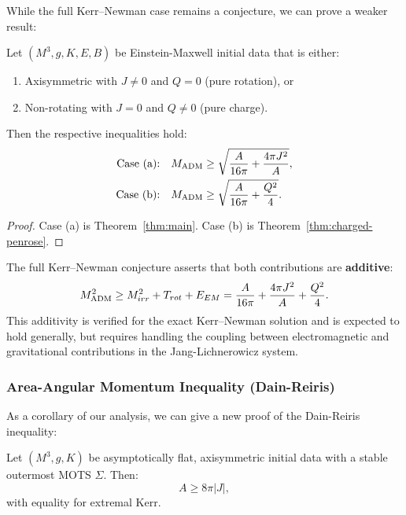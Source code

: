 While the full Kerr--Newman case remains a conjecture, we can prove a weaker result:

\begin{theorem}\label{thm:partial-KN}
Let $(M^3, g, K, E, B)$ be Einstein-Maxwell initial data that is either:
\begin{enumerate}[label=(\alph*)]
    \item Axisymmetric with $J \neq 0$ and $Q = 0$ (pure rotation), or
    \item Non-rotating with $J = 0$ and $Q \neq 0$ (pure charge).
\end{enumerate}
Then the respective inequalities hold:
\begin{align}
    \text{Case (a):} \quad M_{\mathrm{ADM}} &\geq \sqrt{\frac{A}{16\pi} + \frac{4\pi J^2}{A}}, \\
    \text{Case (b):} \quad M_{\mathrm{ADM}} &\geq \sqrt{\frac{A}{16\pi} + \frac{Q^2}{4}}.
\end{align}
\end{theorem}

\begin{proof}
Case (a) is Theorem~\ref{thm:main}. Case (b) is Theorem~\ref{thm:charged-penrose}.
\end{proof}

\begin{remark}
The full Kerr--Newman conjecture asserts that both contributions are \textbf{additive}:
\[
M_{\mathrm{ADM}}^2 \geq M_{irr}^2 + T_{rot} + E_{EM} = \frac{A}{16\pi} + \frac{4\pi J^2}{A} + \frac{Q^2}{4}.
\]
This additivity is verified for the exact Kerr--Newman solution and is expected to hold generally, but requires handling the coupling between electromagnetic and gravitational contributions in the Jang-Lichnerowicz system.
\end{remark}

\subsubsection{Area-Angular Momentum Inequality (Dain-Reiris)}

As a corollary of our analysis, we can give a new proof of the Dain-Reiris inequality:

\begin{theorem}\label{thm:area-J}
Let $(M^3, g, K)$ be asymptotically flat, axisymmetric initial data with a stable outermost MOTS $\Sigma$. Then:
\begin{equation}
    A \geq 8\pi |J|,
\end{equation}
with equality for extremal Kerr.
\end{theorem}

